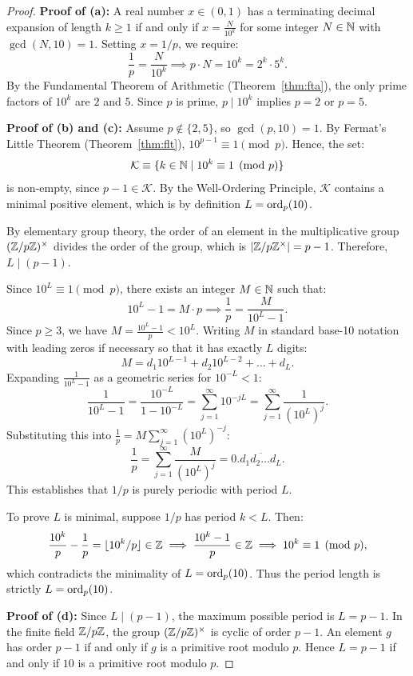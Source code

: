 \begin{proof}
\leanok
\textbf{Proof of (a):} A real number $x \in (0, 1)$ has a terminating decimal expansion of length $k \ge 1$ if and only if $x = \frac{N}{10^k}$ for some integer $N \in \mathbb{N}$ with $\gcd(N, 10) = 1$. Setting $x = 1/p$, we require:
$$\frac{1}{p} = \frac{N}{10^k} \implies p \cdot N = 10^k = 2^k \cdot 5^k.$$
By the Fundamental Theorem of Arithmetic (Theorem~\ref{thm:fta}), the only prime factors of $10^k$ are $2$ and $5$. Since $p$ is prime, $p \mid 10^k$ implies $p = 2$ or $p = 5$.

\textbf{Proof of (b) and (c):} Assume $p \notin \{2, 5\}$, so $\gcd(p, 10) = 1$.
By Fermat's Little Theorem (Theorem~\ref{thm:flt}), $10^{p-1} \equiv 1 \pmod p$. Hence, the set:
$$\mathcal{K} \equiv \{k \in \mathbb{N} \mid 10^k \equiv 1 \pmod p\}$$
is non-empty, since $p - 1 \in \mathcal{K}$. By the Well-Ordering Principle, $\mathcal{K}$ contains a minimal positive element, which is by definition $L = \operatorname{ord}_p(10)$.

By elementary group theory, the order of an element in the multiplicative group $(\mathbb{Z}/p\mathbb{Z})^\times$ divides the order of the group, which is $|\mathbb{Z}/p\mathbb{Z}^\times| = p - 1$. Therefore, $L \mid (p - 1)$.

Since $10^L \equiv 1 \pmod p$, there exists an integer $M \in \mathbb{N}$ such that:
$$10^L - 1 = M \cdot p \implies \frac{1}{p} = \frac{M}{10^L - 1}.$$
Since $p \ge 3$, we have $M = \frac{10^L - 1}{p} < 10^L$. Writing $M$ in standard base-10 notation with leading zeros if necessary so that it has exactly $L$ digits:
$$M = d_1 10^{L-1} + d_2 10^{L-2} + \dots + d_L.$$
Expanding $\frac{1}{10^L - 1}$ as a geometric series for $10^{-L} < 1$:
$$\frac{1}{10^L - 1} = \frac{10^{-L}}{1 - 10^{-L}} = \sum_{j=1}^\infty 10^{-j L} = \sum_{j=1}^\infty \frac{1}{(10^L)^j}.$$
Substituting this into $\frac{1}{p} = M \sum_{j=1}^\infty (10^L)^{-j}$:
$$\frac{1}{p} = \sum_{j=1}^\infty \frac{M}{(10^L)^j} = 0.\overline{d_1 d_2 \dots d_L}.$$
This establishes that $1/p$ is purely periodic with period $L$.

To prove $L$ is minimal, suppose $1/p$ has period $k < L$. Then:
$$\frac{10^k}{p} - \frac{1}{p} = \lfloor 10^k / p \rfloor \in \mathbb{Z} \implies \frac{10^k - 1}{p} \in \mathbb{Z} \implies 10^k \equiv 1 \pmod p,$$
which contradicts the minimality of $L = \operatorname{ord}_p(10)$. Thus the period length is strictly $L = \operatorname{ord}_p(10)$.

\textbf{Proof of (d):} Since $L \mid (p - 1)$, the maximum possible period is $L = p - 1$. In the finite field $\mathbb{Z}/p\mathbb{Z}$, the group $(\mathbb{Z}/p\mathbb{Z})^\times$ is cyclic of order $p - 1$. An element $g$ has order $p - 1$ if and only if $g$ is a primitive root modulo $p$. Hence $L = p - 1$ if and only if $10$ is a primitive root modulo $p$.
\end{proof}

